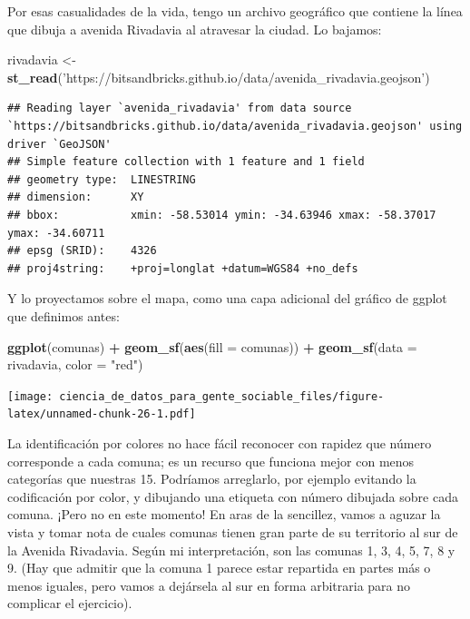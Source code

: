\documentclass[]{book}
\newenvironment{Shaded}{\begin{snugshade}}{\end{snugshade}}
\newcommand{\KeywordTok}[1]{\textcolor[rgb]{0.13,0.29,0.53}{\textbf{#1}}}
\newcommand{\DataTypeTok}[1]{\textcolor[rgb]{0.13,0.29,0.53}{#1}}
\newcommand{\StringTok}[1]{\textcolor[rgb]{0.31,0.60,0.02}{#1}}
\newcommand{\OperatorTok}[1]{\textcolor[rgb]{0.81,0.36,0.00}{\textbf{#1}}}
\newcommand{\NormalTok}[1]{#1}
\begin{document}
Por esas casualidades de la vida, tengo un archivo geográfico que
contiene la línea que dibuja a avenida Rivadavia al atravesar la ciudad.
Lo bajamos:

\begin{Shaded}
\begin{Highlighting}[]
\NormalTok{rivadavia <-}\StringTok{ }\KeywordTok{st_read}\NormalTok{(}\StringTok{'https://bitsandbricks.github.io/data/avenida_rivadavia.geojson'}\NormalTok{)}
\end{Highlighting}
\end{Shaded}

\begin{verbatim}
## Reading layer `avenida_rivadavia' from data source `https://bitsandbricks.github.io/data/avenida_rivadavia.geojson' using driver `GeoJSON'
## Simple feature collection with 1 feature and 1 field
## geometry type:  LINESTRING
## dimension:      XY
## bbox:           xmin: -58.53014 ymin: -34.63946 xmax: -58.37017 ymax: -34.60711
## epsg (SRID):    4326
## proj4string:    +proj=longlat +datum=WGS84 +no_defs
\end{verbatim}

Y lo proyectamos sobre el mapa, como una capa adicional del gráfico de
ggplot que definimos antes:

\begin{Shaded}
\begin{Highlighting}[]
\KeywordTok{ggplot}\NormalTok{(comunas) }\OperatorTok{+}
\StringTok{    }\KeywordTok{geom_sf}\NormalTok{(}\KeywordTok{aes}\NormalTok{(}\DataTypeTok{fill =}\NormalTok{ comunas)) }\OperatorTok{+}
\StringTok{    }\KeywordTok{geom_sf}\NormalTok{(}\DataTypeTok{data =}\NormalTok{ rivadavia, }\DataTypeTok{color =} \StringTok{"red"}\NormalTok{)}
\end{Highlighting}
\end{Shaded}

\texttt{[image: ciencia\_de\_datos\_para\_gente\_sociable\_files/figure-latex/unnamed-chunk-26-1.pdf]}

La identificación por colores no hace fácil reconocer con rapidez que
número corresponde a cada comuna; es un recurso que funciona mejor con
menos categorías que nuestras 15. Podríamos arreglarlo, por ejemplo
evitando la codificación por color, y dibujando una etiqueta con número
dibujada sobre cada comuna. ¡Pero no en este momento! En aras de la
sencillez, vamos a aguzar la vista y tomar nota de cuales comunas tienen
gran parte de su territorio al sur de la Avenida Rivadavia. Según mi
interpretación, son las comunas 1, 3, 4, 5, 7, 8 y 9. (Hay que admitir
que la comuna 1 parece estar repartida en partes más o menos iguales,
pero vamos a dejársela al sur en forma arbitraria para no complicar el
ejercicio).
\end{document}
